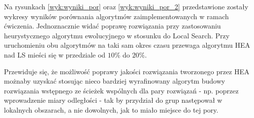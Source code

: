 \documentclass{article}
\begin{document}
Na rysunkach \ref{wyk:wyniki_por} oraz \ref{wyk:wyniki_por_2} przedstawione zostały wykresy wyników porównania algorytmów zaimplementowanych w ramach ćwiczenia. Jednoznacznie widać poprawę rozwiązania przy zastosowaniu heurystycznego algorytmu ewolucyjnego w stosunku do Local Search. Przy uruchomieniu obu algorytmów na taki sam okres czasu przewaga algorytmu HEA nad LS mieści się w przedziale od $10\%$ do $20\%$. 

Przewiduje się, że możliwość poprawy jakości rozwiązania tworzonego przez HEA możnaby uzyskać stosując nieco bardziej wyrafinowany algorytm budowy rozwiązania wstępnego ze ścieżek wspólnych dla pary rozwiązań - np. poprzez wprowadzenie miary odległości - tak by przydział do grup następował w lokalnych obszarach, a nie dowolnych, jak to miało miejsce do tej pory.
\end{document}
